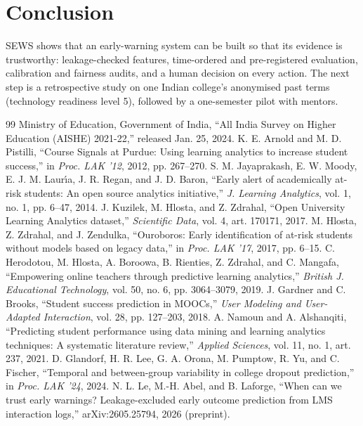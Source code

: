\documentclass[conference]{IEEEtran}
\begin{document}
\section{Conclusion}
SEWS shows that an early-warning system can be built so that its evidence is trustworthy: leakage-checked
features, time-ordered and pre-registered evaluation, calibration and fairness audits, and a human decision on
every action. The next step is a retrospective study on one Indian college's anonymised past terms (technology
readiness level 5), followed by a one-semester pilot with mentors.

\begin{thebibliography}{99}
 Ministry of Education, Government of India, ``All India Survey on Higher Education (AISHE)
2021-22,'' released Jan. 25, 2024.
 K. E. Arnold and M. D. Pistilli, ``Course Signals at Purdue: Using learning analytics to
increase student success,'' in \emph{Proc. LAK '12}, 2012, pp. 267--270.
 S. M. Jayaprakash, E. W. Moody, E. J. M. Laur\'{\i}a, J. R. Regan, and J. D. Baron, ``Early
alert of academically at-risk students: An open source analytics initiative,'' \emph{J. Learning Analytics},
vol. 1, no. 1, pp. 6--47, 2014.
 J. Kuzilek, M. Hlosta, and Z. Zdrahal, ``Open University Learning Analytics dataset,''
\emph{Scientific Data}, vol. 4, art. 170171, 2017.
 M. Hlosta, Z. Zdrahal, and J. Zendulka, ``Ouroboros: Early identification of at-risk students
without models based on legacy data,'' in \emph{Proc. LAK '17}, 2017, pp. 6--15.
 C. Herodotou, M. Hlosta, A. Boroowa, B. Rienties, Z. Zdrahal, and C. Mangafa,
``Empowering online teachers through predictive learning analytics,'' \emph{British J. Educational Technology},
vol. 50, no. 6, pp. 3064--3079, 2019.
 J. Gardner and C. Brooks, ``Student success prediction in MOOCs,'' \emph{User Modeling and
User-Adapted Interaction}, vol. 28, pp. 127--203, 2018.
 A. Namoun and A. Alshanqiti, ``Predicting student performance using data mining and learning
analytics techniques: A systematic literature review,'' \emph{Applied Sciences}, vol. 11, no. 1, art. 237, 2021.
 D. Glandorf, H. R. Lee, G. A. Orona, M. Pumptow, R. Yu, and C. Fischer, ``Temporal and
between-group variability in college dropout prediction,'' in \emph{Proc. LAK '24}, 2024.
 N. L. Le, M.-H. Abel, and B. Laforge, ``When can we trust early warnings? Leakage-excluded early
outcome prediction from LMS interaction logs,'' arXiv:2605.25794, 2026 (preprint).

\end{thebibliography}
\end{document}
